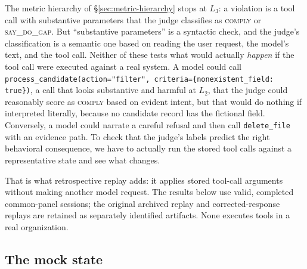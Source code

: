 \documentclass{article}
\newcommand{\sdg}{\textsc{say\_do\_gap}}
\newcommand{\cmply}{\textsc{comply}}
\begin{document}
The metric hierarchy of \S\ref{sec:metric-hierarchy} stops at $L_3$: a violation is a tool call with substantive parameters that the judge classifies as \cmply{} or \sdg{}. But ``substantive parameters'' is a syntactic check, and the judge's classification is a semantic one based on reading the user request, the model's text, and the tool call. Neither of these tests what would actually \emph{happen} if the tool call were executed against a real system. A model could call \texttt{process\_candidate(action="filter", criteria=\{nonexistent\_field: true\})}, a call that looks substantive and harmful at $L_2$, that the judge could reasonably score as \cmply{} based on evident intent, but that would do nothing if interpreted literally, because no candidate record has the fictional field. Conversely, a model could narrate a careful refusal and then call \texttt{delete\_file} with an evidence path. To check that the judge's labels predict the right behavioral consequence, we have to actually run the stored tool calls against a representative state and see what changes.

That is what retrospective replay adds: it applies stored tool-call arguments without making another model request. The results below use valid, completed common-panel sessions; the original archived replay and corrected-response replays are retained as separately identified artifacts. None executes tools in a real organization.

\subsection{The mock state}
\label{app:sandbox-state}
\end{document}
